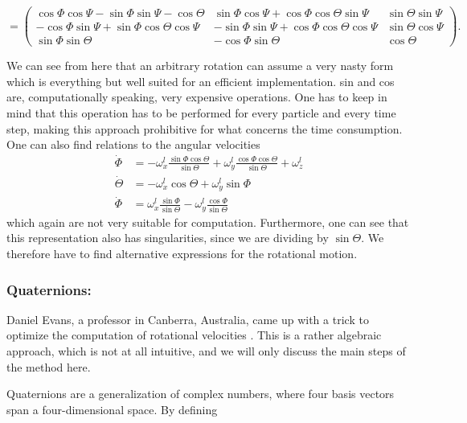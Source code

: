 $$
= 
\begin{pmatrix}
 \cos{\Phi} \cos{\Psi}  -\sin{\Phi}\sin{\Psi}-\cos{\Theta}   & \sin{\Phi}\cos{\Psi} + \cos{\Phi}\cos{\Theta}\sin{\Psi} & \sin{\Theta}\sin{\Psi}\\
 -\cos{\Phi}\sin{\Psi} +\sin{\Phi}\cos{\Theta}\cos{\Psi} & -\sin{\Phi}\sin{\Psi} + \cos{\Phi}\cos{\Theta}\cos{\Psi} & \sin{\Theta}\cos{\Psi} \\
 \sin{\Phi}\sin{\Theta} & -\cos{\Phi}\sin{\Theta} & \cos{\Theta}
\end{pmatrix} .
$$

We can see from here that an arbitrary rotation can assume a very nasty form which is everything but well suited for an efficient implementation. sin and cos are, computationally speaking, very expensive operations. One has to keep in mind that this operation has to be performed for every particle and every time step, making this approach prohibitive for what concerns the time consumption. One can also find relations to the angular velocities
\begin{align}
\dot{\Phi} &= -\omega^l_x \frac{\sin{\Phi}\cos{\Theta}}{\sin{\Theta}} + \omega^l_y \frac{\cos{\Phi}\cos{\Theta}}{\sin{\Theta}} + \omega^l_z  \\
\dot{\Theta} &= -\omega^l_x\cos{\Theta} + \omega^l_y \sin{\Phi}  \\
\dot{\Phi} &= \omega^l_x \frac{\sin{\Phi}}{\sin{\Theta}} - \omega^l_y \frac{\cos{\Phi}}{\sin{\Theta}} 
\label{eq:ang_veloc}
\end{align}
which again are not very suitable for computation. Furthermore, one can see that this representation also has singularities, since we are dividing by $\sin{\Theta}$. We therefore have to find alternative expressions for the rotational motion.

\subsubsection*{Quaternions:}
Daniel Evans, a professor in Canberra, Australia, came up with a trick to optimize the computation of rotational velocities \citep{evans1,evans2}. This is a rather algebraic approach, which is not at all intuitive, and we will only discuss the main steps of the method here. 

Quaternions are a generalization of complex numbers, where four basis vectors span a four-dimensional space. By defining

